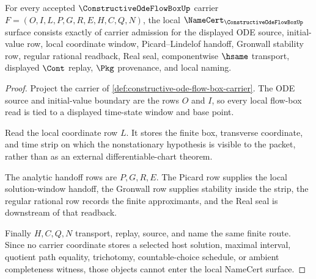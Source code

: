 \begin{theorem}
\label{thm:constructive-ode-flow-box-namecert-obligations}
For every accepted $\ConstructiveOdeFlowBoxUp$ carrier $F=(O,I,L,P,G,R,E,H,C,Q,N)$, the local $\NameCert_{\ConstructiveOdeFlowBoxUp}$ surface consists exactly of carrier admission for the displayed ODE source, initial-value row, local coordinate window, Picard--Lindelof handoff, Gronwall stability row, regular rational readback, Real seal, componentwise $\hsame$ transport, displayed $\Cont$ replay, $\Pkg$ provenance, and local naming.
\end{theorem}
\begin{proof}
Project the carrier of \autoref{def:constructive-ode-flow-box-carrier}. The ODE source and initial-value boundary are the rows $O$ and $I$, so every local flow-box read is tied to a displayed time-state window and base point.

Read the local coordinate row $L$. It stores the finite box, transverse coordinate, and time strip on which the nonstationary hypothesis is visible to the packet, rather than as an external differentiable-chart theorem.

The analytic handoff rows are $P,G,R,E$. The Picard row supplies the local solution-window handoff, the Gronwall row supplies stability inside the strip, the regular rational row records the finite approximants, and the Real seal is downstream of that readback.

Finally $H,C,Q,N$ transport, replay, source, and name the same finite route. Since no carrier coordinate stores a selected host solution, maximal interval, quotient path equality, trichotomy, countable-choice schedule, or ambient completeness witness, those objects cannot enter the local NameCert surface.
\end{proof}

